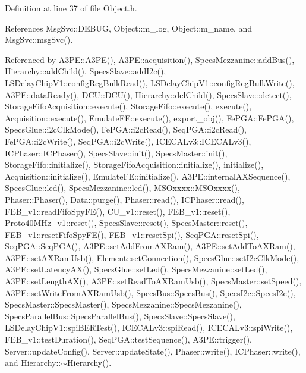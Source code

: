 Definition at line 37 of file Object.\+h.



References Msg\+Svc\+::\+D\+E\+B\+UG, Object\+::m\+\_\+log, Object\+::m\+\_\+name, and Msg\+Svc\+::msg\+Svc().



Referenced by A3\+P\+E\+::\+A3\+P\+E(), A3\+P\+E\+::acquisition(), Specs\+Mezzanine\+::add\+Bus(), Hierarchy\+::add\+Child(), Specs\+Slave\+::add\+I2c(), L\+S\+Delay\+Chip\+V1\+::config\+Reg\+Bulk\+Read(), L\+S\+Delay\+Chip\+V1\+::config\+Reg\+Bulk\+Write(), A3\+P\+E\+::data\+Ready(), D\+C\+U\+::\+D\+C\+U(), Hierarchy\+::del\+Child(), Specs\+Slave\+::detect(), Storage\+Fifo\+Acquisition\+::execute(), Storage\+Fifo\+::execute(), execute(), Acquisition\+::execute(), Emulate\+F\+E\+::execute(), export\+\_\+obj(), Fe\+P\+G\+A\+::\+Fe\+P\+G\+A(), Specs\+Glue\+::i2c\+Clk\+Mode(), Fe\+P\+G\+A\+::i2c\+Read(), Seq\+P\+G\+A\+::i2c\+Read(), Fe\+P\+G\+A\+::i2c\+Write(), Seq\+P\+G\+A\+::i2c\+Write(), I\+C\+E\+C\+A\+Lv3\+::\+I\+C\+E\+C\+A\+Lv3(), I\+C\+Phaser\+::\+I\+C\+Phaser(), Specs\+Slave\+::init(), Specs\+Master\+::init(), Storage\+Fifo\+::initialize(), Storage\+Fifo\+Acquisition\+::initialize(), initialize(), Acquisition\+::initialize(), Emulate\+F\+E\+::initialize(), A3\+P\+E\+::internal\+A\+X\+Sequence(), Specs\+Glue\+::led(), Specs\+Mezzanine\+::led(), M\+S\+Oxxxx\+::\+M\+S\+Oxxxx(), Phaser\+::\+Phaser(), Data\+::purge(), Phaser\+::read(), I\+C\+Phaser\+::read(), F\+E\+B\+\_\+v1\+::read\+Fifo\+Spy\+F\+E(), C\+U\+\_\+v1\+::reset(), F\+E\+B\+\_\+v1\+::reset(), Proto40\+M\+Hz\+\_\+v1\+::reset(), Specs\+Slave\+::reset(), Specs\+Master\+::reset(), F\+E\+B\+\_\+v1\+::reset\+Fifo\+Spy\+F\+E(), F\+E\+B\+\_\+v1\+::reset\+Spi(), Seq\+P\+G\+A\+::reset\+Spi(), Seq\+P\+G\+A\+::\+Seq\+P\+G\+A(), A3\+P\+E\+::set\+Add\+From\+A\+X\+Ram(), A3\+P\+E\+::set\+Add\+To\+A\+X\+Ram(), A3\+P\+E\+::set\+A\+X\+Ram\+Usb(), Element\+::set\+Connection(), Specs\+Glue\+::set\+I2c\+Clk\+Mode(), A3\+P\+E\+::set\+Latency\+A\+X(), Specs\+Glue\+::set\+Led(), Specs\+Mezzanine\+::set\+Led(), A3\+P\+E\+::set\+Length\+A\+X(), A3\+P\+E\+::set\+Read\+To\+A\+X\+Ram\+Usb(), Specs\+Master\+::set\+Speed(), A3\+P\+E\+::set\+Write\+From\+A\+X\+Ram\+Usb(), Specs\+Bus\+::\+Specs\+Bus(), Specs\+I2c\+::\+Specs\+I2c(), Specs\+Master\+::\+Specs\+Master(), Specs\+Mezzanine\+::\+Specs\+Mezzanine(), Specs\+Parallel\+Bus\+::\+Specs\+Parallel\+Bus(), Specs\+Slave\+::\+Specs\+Slave(), L\+S\+Delay\+Chip\+V1\+::spi\+B\+E\+R\+Test(), I\+C\+E\+C\+A\+Lv3\+::spi\+Read(), I\+C\+E\+C\+A\+Lv3\+::spi\+Write(), F\+E\+B\+\_\+v1\+::test\+Duration(), Seq\+P\+G\+A\+::test\+Sequence(), A3\+P\+E\+::trigger(), Server\+::update\+Config(), Server\+::update\+State(), Phaser\+::write(), I\+C\+Phaser\+::write(), and Hierarchy\+::$\sim$\+Hierarchy().


